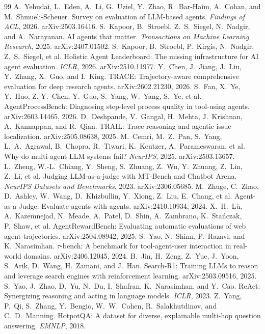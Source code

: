 \documentclass[10pt]{article}
\begin{document}
\clearpage
\renewcommand{\refname}{\normalsize References}
\begin{thebibliography}{99}\small\setlength{\itemsep}{0pt}
 A.~Yehudai, L.~Eden, A.~Li, G.~Uziel, Y.~Zhao, R.~Bar-Haim, A.~Cohan, and M.~Shmueli-Scheuer. Survey on evaluation of LLM-based agents. \emph{Findings of ACL}, 2026. arXiv:2503.16416.
 S.~Kapoor, B.~Stroebl, Z.~S.~Siegel, N.~Nadgir, and A.~Narayanan. AI agents that matter. \emph{Transactions on Machine Learning Research}, 2025. arXiv:2407.01502.
 S.~Kapoor, B.~Stroebl, P.~Kirgis, N.~Nadgir, Z.~S.~Siegel, et al. Holistic Agent Leaderboard: The missing infrastructure for AI agent evaluation. \emph{ICLR}, 2026. arXiv:2510.11977.
 Y.~Chen, J.~Jiang, J.~Liu, Y.~Zhang, X.~Guo, and I.~King. TRACE: Trajectory-aware comprehensive evaluation for deep research agents. arXiv:2602.21230, 2026.
 S.~Fan, X.~Ye, Y.~Huo, Z.-Y.~Chen, Y.~Guo, S.~Yang, W.~Yang, S.~Ye, et al. AgentProcessBench: Diagnosing step-level process quality in tool-using agents. arXiv:2603.14465, 2026.
 D.~Deshpande, V.~Gangal, H.~Mehta, J.~Krishnan, A.~Kannappan, and R.~Qian. TRAIL: Trace reasoning and agentic issue localization. arXiv:2505.08638, 2025.
 M.~Cemri, M.~Z.~Pan, S.~Yang, L.~A.~Agrawal, B.~Chopra, R.~Tiwari, K.~Keutzer, A.~Parameswaran, et al. Why do multi-agent LLM systems fail? \emph{NeurIPS}, 2025. arXiv:2503.13657.
 L.~Zheng, W.-L.~Chiang, Y.~Sheng, S.~Zhuang, Z.~Wu, Y.~Zhuang, Z.~Lin, Z.~Li, et al. Judging LLM-as-a-judge with MT-Bench and Chatbot Arena. \emph{NeurIPS Datasets and Benchmarks}, 2023. arXiv:2306.05685.
 M.~Zhuge, C.~Zhao, D.~Ashley, W.~Wang, D.~Khizbullin, Y.~Xiong, Z.~Liu, E.~Chang, et al. Agent-as-a-Judge: Evaluate agents with agents. arXiv:2410.10934, 2024.
 X.~H.~L\`u, A.~Kazemnejad, N.~Meade, A.~Patel, D.~Shin, A.~Zambrano, K.~Sta\'nczak, P.~Shaw, et al. AgentRewardBench: Evaluating automatic evaluations of web agent trajectories. arXiv:2504.08942, 2025.
 S.~Yao, N.~Shinn, P.~Razavi, and K.~Narasimhan. $\tau$-bench: A benchmark for tool-agent-user interaction in real-world domains. arXiv:2406.12045, 2024.
 B.~Jin, H.~Zeng, Z.~Yue, J.~Yoon, S.~Arik, D.~Wang, H.~Zamani, and J.~Han. Search-R1: Training LLMs to reason and leverage search engines with reinforcement learning. arXiv:2503.09516, 2025.
 S.~Yao, J.~Zhao, D.~Yu, N.~Du, I.~Shafran, K.~Narasimhan, and Y.~Cao. ReAct: Synergizing reasoning and acting in language models. \emph{ICLR}, 2023.
 Z.~Yang, P.~Qi, S.~Zhang, Y.~Bengio, W.~W.~Cohen, R.~Salakhutdinov, and C.~D.~Manning. HotpotQA: A dataset for diverse, explainable multi-hop question answering. \emph{EMNLP}, 2018.
\end{thebibliography}
\end{document}
